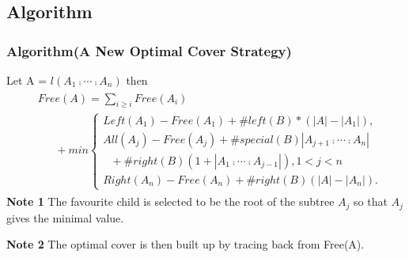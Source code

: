 \documentclass{beamer}
\begin{document}
\subsection{Algorithm}
\begin{frame}
\frametitle{Algorithm(A New Optimal Cover Strategy)}
Let A = $l(A_1 \comp \cdots \comp A_n)$ then
\begin{eqnarray*}
\begin{split}
&Free(A) = \sum_{i \geq i}Free(A_i) \\ 
& \ \ \ \ \ \ \ + min \begin{cases}
	  Left(A_1) - Free(A_1) + \#left(B) * (\left\vert A \right\vert - \left\vert A_1 \right\vert),\\
	  All(A_j) -Free(A_j) + \#special(B)\left\vert A_{j+1} \comp \cdots \comp A_n \right\vert \\
	 \ \ \ + \#right(B)(1 + \left\vert A_1 \comp \cdots \comp A_{j-1} \right\vert), 1 < j < n\\
	 Right(A_n) - Free(A_n) + \#right(B)(\left\vert A \right\vert - \left\vert A_n \right\vert).
      \end{cases}
\end{split}
\end{eqnarray*}
\textbf{Note 1} The favourite child is selected to be the root of the subtree $A_j$ so that $A_j$ gives the minimal value.

\textbf{Note 2} The optimal cover is then built up by tracing back from Free(A). 
\end{frame}

\end{document}

